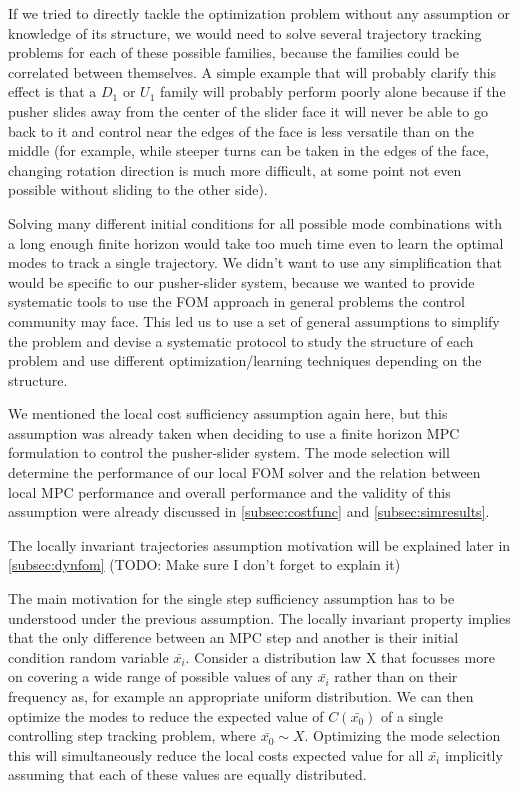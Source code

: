 \documentclass[12,twoside]{TFG-GM}
\theoremstyle{definition}
\theoremstyle{remark}
\newcommand*\diff[1]{\bar{#1}}
\begin{document}
If we tried to directly tackle the optimization problem without any assumption or knowledge of its structure, we would need to solve several trajectory tracking problems for each of these possible families, because the families could be correlated between themselves. A simple example that will probably clarify this effect is that a $D_1$ or $U_1$ family will probably perform poorly alone because if the pusher slides away from the center of the slider face it will never be able to go back to it and control near the edges of the face is less versatile than on the middle (for example, while steeper turns can be taken in the edges of the face, changing rotation direction is much more difficult, at some point not even possible without sliding to the other side).

Solving many different initial conditions for all possible mode combinations with a long enough finite horizon would take too much time even to learn the optimal modes to track a single trajectory. We didn't want to use any simplification that would be specific to our pusher-slider system, because we wanted to provide systematic tools to use the FOM approach in general problems the control community may face. This led us to use a set of general assumptions to simplify the problem and devise a systematic protocol to study the structure of each problem and use different optimization/learning techniques depending on the structure.

We mentioned the local cost sufficiency assumption again here, but this assumption was already taken when deciding to use a finite horizon MPC formulation to control the pusher-slider system. The mode selection will determine the performance of our local FOM solver and the relation between local MPC performance and overall performance and the validity of this assumption were already discussed in \ref{subsec:costfunc} and \ref{subsec:simresults}.

The locally invariant trajectories assumption motivation will be explained later in \ref{subsec:dynfom} (TODO: Make sure I don't forget to explain it)

The main motivation for the single step sufficiency assumption has to be understood under the previous assumption. The locally invariant property implies that the only difference between an MPC step and another is their initial condition random variable $\diff{x_i}$. Consider a distribution law X that focusses more on covering a wide range of possible values of any $\diff{x_i}$ rather than on their frequency as, for example an appropriate uniform distribution. We can then optimize the modes to reduce the expected value of $C(\diff{x_0})$ of a single controlling step tracking problem, where $\diff{x_0} \sim X$. Optimizing the mode selection this will simultaneously reduce the local costs expected value for all $\diff{x_i}$ implicitly assuming that each of these values are equally distributed.
\end{document}
